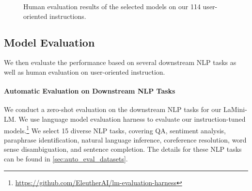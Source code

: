\documentclass[11pt]{article}
\newcommand{\modelname}{LaMini\xspace}
\newcommand{\modelnamefull}{LaMini-LM\xspace}
\begin{document}
\begin{figure*}[t]
    \caption{
        Human evaluation results of the selected models on our 114 user-oriented instructions.
    }
    \label{fig:human_eval_user}
\end{figure*} 

\subsection{Model Evaluation}
\label{sec:model_eval}

We then evaluate the performance based on several downstream NLP tasks as well as human evaluation on user-oriented instruction. 

\paragraph{Automatic Evaluation on Downstream NLP Tasks}
We conduct a zero-shot evaluation on the downstream NLP tasks for our \modelnamefull.
We use language model evaluation harness \cite{eval-harness} to evaluate our instruction-tuned models.\footnote{\url{https://github.com/EleutherAI/lm-evaluation-harness}} 
We select 15 diverse NLP tasks, covering QA, sentiment analysis, paraphrase identification, natural language inference, coreference resolution, word sense disambiguation, and sentence completion. The details for these NLP tasks can be found in \autoref{sec:auto_eval_datasets}.
\end{document}
